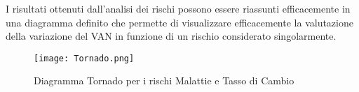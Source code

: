 I risultati ottenuti dall'analisi dei rischi possono essere riassunti efficacemente in una diagramma definito che permette di visualizzare efficacemente la valutazione della variazione del VAN in funzione di un rischio considerato singolarmente.
\begin{figure}[htbp]
\centering
\texttt{[image: Tornado.png]}
\caption{Diagramma Tornado per i rischi Malattie e Tasso di Cambio \label{fig:tornado}}
\end{figure}